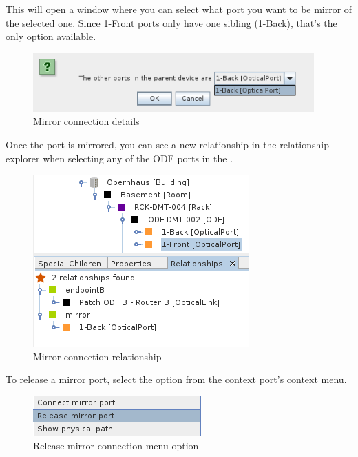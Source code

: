 \documentclass[a4paper]{article}
\begin{document}
\begin{enumerate}
					This will open a window where you can select what port you want to be mirror of the selected one. Since 1-Front ports only have one sibling (1-Back), that's the only option available.
					\begin{figure}[h!]
						\centering
						\includegraphics[width=0.5\linewidth]{img/l1_example_2_mirror_connection_details.png}
						\caption{Mirror connection details}
						\label{fig:l1_example_2_mirror_connection_details}
					\end{figure}
					
					Once the port is mirrored, you can see a new relationship in the relationship explorer when selecting any of the ODF ports in the \textbf{}.
					\begin{figure}[h!]
						\centering
						\includegraphics[width=0.4\linewidth]{img/l1_example_2_mirror_connection_relationships.png}
						\caption{Mirror connection relationship}
						\label{fig:l1_example_2_mirror_connection_relationships}
					\end{figure}
					
					To release a mirror port, select the option from the context port's context menu.
					\begin{figure}[h!]
						\centering
						\includegraphics[width=0.3\linewidth]{img/l1_example_2_mirror_connection_release.png}
						\caption{Release mirror connection menu option}
						\label{fig:l1_example_2_mirror_connection_release}
					\end{figure}
			\end{enumerate}
			
\end{document}
